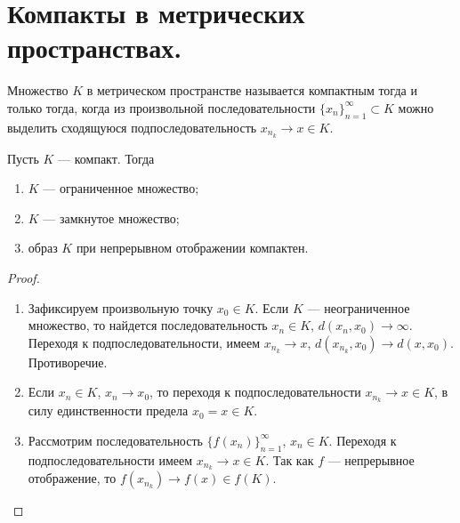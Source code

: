 \documentclass[a4paper]{article}
\theoremstyle{named}
\begin{document}
    \section{Компакты в метрических пространствах.}

    \begin{definition*}
        Множество $K$ в метрическом пространстве называется компактным тогда и только тогда, когда из произвольной последовательности $\{x_n\}_{n = 1}^{\infty} \subset K$ можно выделить сходящуюся подпоследовательность $x_{n_k} \to x \in K$.
    \end{definition*}

    \begin{lemma*}
        Пусть $K$ --- компакт. Тогда
        \begin{enumerate}
        \item
            $K$ --- ограниченное множество;

        \item
            $K$ --- замкнутое множество;

        \item
            образ $K$ при непрерывном отображении компактен.
        \end{enumerate}
    \end{lemma*}

    \begin{proof}
        ~

        \begin{enumerate}
        \item
            Зафиксируем произвольную точку $x_0 \in K$. Если $K$ --- неограниченное множество, то найдется последовательность $x_n \in K$, $d(x_n, x_0) \to \infty$. Переходя к подпоследовательности, имеем $x_{n_k} \to x$, $d(x_{n_k}, x_0) \to d(x, x_0)$. Противоречие.

        \item
            Если $x_n \in K$, $x_n \to x_0$, то переходя к подпоследовательности $x_{n_k} \to x \in K$, в силу единственности предела $x_0 = x \in K$.

        \item
            Рассмотрим последовательность $\{f(x_n)\}_{n = 1}^{\infty}$, $x_n \in K$. Переходя к подпоследовательности имеем $x_{n_k} \to x \in K$. Так как $f$ --- непрерывное отображение, то $f(x_{n_k}) \to f(x) \in f(K)$.
        \end{enumerate}
    \end{proof}
\end{document}
